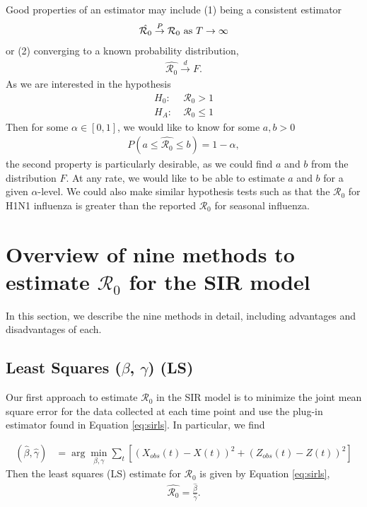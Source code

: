 \documentclass[12pt]{article}
\newcommand{\wxxsir}{nine }
\newcommand{\rr}{\ensuremath{\mathcal{R}_0}}
\begin{document}
Good properties of an estimator may include (1) being a consistent estimator
\begin{align*}
  \hat{\rr} \overset{P}{\to} \rr \textnormal{ as } T\to \infty
\end{align*}
or (2) converging to a known probability distribution,
\begin{align*}
\hat{\rr} \overset{d}{\to} F.  
\end{align*}
As we are interested in the hypothesis
\begin{align*}
  H_0:\;& \rr > 1 \\
  H_A:\;& \rr \le 1
\end{align*}
Then for some $\alpha \in [0,1]$, we would like to know for some $a, b >0$
\begin{align*}
P(a \le \hat{\rr} \le b) = 1 - \alpha,  
\end{align*}
the second property is particularly desirable, as we could find $a$ and $b$ from the distribution $F$.  At any rate, we would like to be able to estimate $a$ and $b$ for a given $\alpha$-level.  We could also make similar hypothesis tests such as that the $\rr$ for H1N1 influenza is greater than the reported $\rr$ for seasonal influenza.

\section{Overview of \wxxsir methods to estimate $\rr$ for the SIR model}
\label{sec:methods} 

In this section, we describe the \wxxsir methods in detail, including advantages and disadvantages of each.

\subsection{Least Squares ($\beta$, $\gamma$) (LS)}\label{least-squares-beta-gamma}
Our first approach to estimate $\rr$ in the SIR model is to minimize the joint mean square error for the data collected at each time point and use the plug-in estimator found in Equation \ref{eq:sirls}.  In particular, we find

\begin{align*}
(\hat{\beta}, \hat{\gamma} )&=\arg \min_{\beta, \gamma} \sum_{t} \left [ \left (X_{obs}(t) - X(t)\right )^2 + \left ( Z_{obs}(t) - Z(t) \right )^2 \right ]
\end{align*}
Then the least squares (LS) estimate for $\rr$ is given by Equation \ref{eq:sirls},
\begin{align}\label{eq:sirls}
  \hat{\rr}= \frac{\hat{\beta}}{\hat{\gamma}}.
\end{align}
\end{document}
